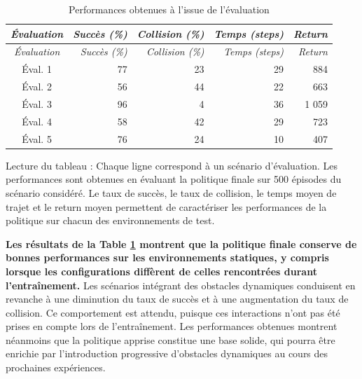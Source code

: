 \begin{longtable}{crrrr}

    \caption{Performances obtenues à l'issue de l'évaluation} \label{tab:eval_perf}                                 \\
    \toprule
    \textit{Évaluation} & \textit{Succès (\%)} & \textit{Collision (\%)} & \textit{Temps (steps)} & \textit{Return} \\
    \midrule
    \endfirsthead
    \toprule
    \textit{Évaluation} & \textit{Succès (\%)} & \textit{Collision (\%)} & \textit{Temps (steps)} & \textit{Return} \\
    \midrule
    \endhead
    \midrule
    \endfoot
    \bottomrule
    \endlastfoot

    Éval. 1             & 77                   & 23                      & 29                     & 884             \\
    \midrule
    Éval. 2             & 56                   & 44                      & 22                     & 663             \\
    \midrule
    Éval. 3             & 96                   & 4                       & 36                     & 1 059           \\
    \midrule
    Éval. 4             & 58                   & 42                      & 29                     & 723             \\
    \midrule
    Éval. 5             & 76                   & 24                      & 10                     & 407             \\
\end{longtable}
\vspace{-10pt}
{
    \footnotesize
    \color{darkgray}
    \noindent Lecture du tableau : Chaque ligne correspond à un scénario d'évaluation. Les performances sont obtenues en évaluant la politique finale sur 500 épisodes du scénario considéré. Le taux de succès, le taux de collision, le temps moyen de trajet et le return moyen permettent de caractériser les performances de la politique sur chacun des environnements de test.
}

\vspace{10pt}

\noindent \textbf{Les résultats de la Table \ref{tab:eval_perf} montrent que la politique finale conserve de bonnes performances sur les environnements statiques, y compris lorsque les configurations diffèrent de celles rencontrées durant l'entraînement.} Les scénarios intégrant des obstacles dynamiques conduisent en revanche à une diminution du taux de succès et à une augmentation du taux de collision. Ce comportement est attendu, puisque ces interactions n'ont pas été prises en compte lors de l'entraînement. Les performances obtenues montrent néanmoins que la politique apprise constitue une base solide, qui pourra être enrichie par l'introduction progressive d'obstacles dynamiques au cours des prochaines expériences.

